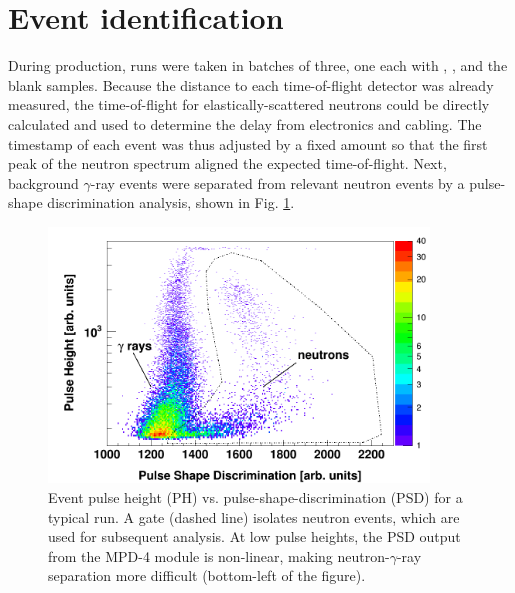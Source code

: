 \section{Event identification}
During production, runs were taken in batches of three, one each with \snTwelve,
\snFour, and the blank samples. Because the distance to each time-of-flight detector
was already measured, the time-of-flight for elastically-scattered neutrons could
be directly calculated and used to determine the delay from electronics and cabling.
The timestamp of each event was thus adjusted by a fixed amount
so that the first peak of the neutron spectrum aligned the expected
time-of-flight. Next, background $\gamma$-ray events were separated from relevant
neutron events by a pulse-shape discrimination analysis, shown in Fig. \ref{PHPSDPlot}.

\begin{figure}[tb]
    \centering
    \includegraphics[width=0.9\textwidth]{figures/PHPSDPlot.png}
    \caption[Event pulse height (PH) vs. pulse-shape-discrimination (PSD) for
    a typical run]
    {
        Event pulse height (PH) vs. pulse-shape-discrimination (PSD) for
        a typical run. A gate (dashed line) isolates neutron events, which are
        used for subsequent analysis. At low pulse heights, the PSD output from the
        MPD-4 module is non-linear, making neutron-$\gamma$-ray separation more difficult
        (bottom-left of the figure).
    }
    \label{PHPSDPlot}
\end{figure}

